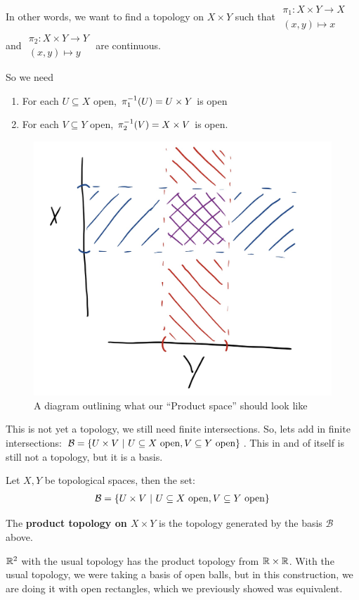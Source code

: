 \documentclass[12pt, twosided]{article}
\begin{document}
    In other words, we want to find a topology on \(X \times Y\) such that \(
    \begin{matrix}
      \pi_1: X \times Y \to X \\ (x, y) \mapsto x
    \end{matrix}
    \) and \(
    \begin{matrix}
      \pi_2: X \times Y \to Y \\ (x, y) \mapsto y
    \end{matrix}
    \) are continuous.

    So we need
    \begin{enumerate}
    \item For each \(U \subseteq X\) open, \(\pi_1^{-1}(U) = U \times Y\) is open
    \item For each \(V \subseteq Y\) open, \(\pi_2^{-1}(V) = X \times V\) is open.
    \end{enumerate}

    \begin{figure}[h]
      \centering
      \includegraphics[width=.5\textwidth]{ProductTop}
      \caption{A diagram outlining what our ``Product space'' should look like}
      \label{fig:prodTop}
    \end{figure}
    This is not yet a topology, we still need finite intersections. So, lets add in finite intersections: \(\mathcal{B} = \opn U \times V \stbar U \subseteq X\ \mathrm{open}, V \subseteq Y\ \mathrm{open} \cls\). This in and of itself is still not a topology, but it is a basis.

    \begin{prop}
      Let \(X, Y\) be topological spaces, then the set:
      \begin{align*}
        \mathcal{B} = \opn U \times V \stbar U \subseteq X\ \mathrm{open}, V \subseteq Y\ \mathrm{open} \cls
      \end{align*}
    \end{prop}

    \begin{df}
      The \textbf{product topology on \(X \times Y\)} is the topology generated by the basis \(\mathcal{B}\) above.
    \end{df}

    \begin{exa}
      \(\mathbb{R}^2\) with the usual topology has the product topology from \(\mathbb{R} \times \mathbb{R}\). With the usual topology, we were taking a basis of open balls, but in this construction, we are doing it with open rectangles, which we previously showed was equivalent.
    \end{exa}
\end{document}
